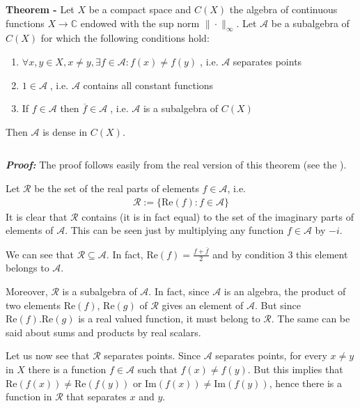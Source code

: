 \documentclass[12pt]{article}
\begin{document}
{\bf Theorem -} Let $X$ be a compact space and $C(X)$ the algebra of continuous functions $X \longrightarrow \mathbb{C}$ endowed with the sup norm $\| \cdot \|_{\infty}$. Let $\mathcal{A}$ be a subalgebra of $C(X)$ for which the following conditions hold:
\begin{enumerate}
\item $\forall x, y \in X, x \ne y, \exists f \in \mathcal{A} : f(x) \neq f(y)\;$, i.e. $\mathcal{A}$ separates points
\item $1 \in \mathcal{A}\;$, i.e. $\mathcal{A}$ contains all constant functions
\item If $f \in \mathcal{A}$ then $\overline{f} \in \mathcal{A}\;$, i.e. $\mathcal{A}$ is a  subalgebra of $C(X)$
\end{enumerate}
Then $\mathcal{A}$ is dense in $C(X)$.

$\,$

{\bf \emph{Proof:}} The proof follows easily from the real version of this theorem (see the ).

Let $\mathcal{R}$ be the set of the real parts of elements $f \in \mathcal{A}$, i.e.
\begin{align*}
\mathcal{R}:=\{ \mathrm{Re}(f): f \in \mathcal{A}\}
\end{align*}
It is clear that $\mathcal{R}$ contains (it is in fact equal) to the set of the imaginary parts of elements of $\mathcal{A}$. This can be seen just by multiplying any function $f \in \mathcal{A}$ by $-i$.

We can see that $\mathcal{R} \subseteq \mathcal{A}$. In fact, $\mathrm{Re}(f)= \frac{f + \overline{f}}{2}$ and by condition 3 this element belongs to $\mathcal{A}$. 

Moreover, $\mathcal{R}$ is a subalgebra of $\mathcal{A}$. In fact, since $\mathcal{A}$ is an algebra, the product of two elements $\mathrm{Re}(f)$, $\mathrm{Re}(g)$  of $\mathcal{R}$ gives an element of $\mathcal{A}$. But since $\mathrm{Re}(f).\mathrm{Re}(g)$ is a real valued function, it must belong to $\mathcal{R}$. The same can be said about sums and products by real scalars.

Let us now see that $\mathcal{R}$ separates points. Since $\mathcal{A}$ separates points, for every $x \neq y$ in $X$ there is a function $f \in \mathcal{A}$ such that $f(x) \neq f(y)$. But this implies that $\mathrm{Re}(f(x)) \neq \mathrm{Re}(f(y))$ or $\mathrm{Im}(f(x)) \neq \mathrm{Im}(f(y))$, hence there is a function in $\mathcal{R}$ that separates $x$ and $y$.
\end{document}
